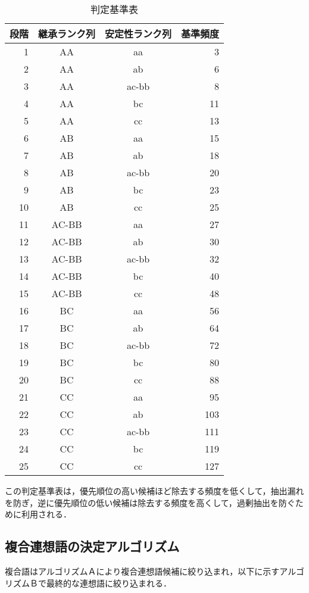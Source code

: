 \begin{table}[t]
 \caption{判定基準表}
 \begin{center}
  \begin{tabular}{rccr}
    \hline\hline
段階 & 継承ランク列 & 安定性ランク列 & 基準頻度 \\
    \hline
1 & AA & aa & 3 \\
2 & AA & ab & 6 \\
3 & AA & ac-bb & 8 \\
4 & AA & bc & 11 \\
5 & AA & cc & 13 \\
6 & AB & aa & 15 \\
7 & AB & ab & 18 \\
8 & AB & ac-bb & 20 \\
9 & AB & bc & 23 \\
10 & AB & cc & 25 \\
11 & AC-BB & aa & 27 \\
12 & AC-BB & ab & 30 \\
13 & AC-BB & ac-bb & 32 \\
14 & AC-BB & bc & 40 \\
15 & AC-BB & cc & 48 \\
16 & BC & aa & 56 \\
17 & BC & ab & 64 \\
18 & BC & ac-bb & 72 \\
19 & BC & bc & 80 \\
20 & BC & cc & 88 \\
21 & CC & aa & 95 \\
22 & CC & ab & 103 \\
23 & CC & ac-bb & 111 \\
24 & CC & bc & 119 \\
25 & CC & cc & 127 \\
    \hline
  \end{tabular}
 \end{center}
\end{table}

この判定基準表は，優先順位の高い候補ほど除去する頻度を低くして，抽出漏れを防ぎ，逆に優先順位の低い候補は除去する頻度を高くして，過剰抽出を防ぐために利用される．

\subsection{複合連想語の決定アルゴリズム}

複合語はアルゴリズムＡにより複合連想語候補に絞り込まれ，以下に示すアルゴリズムＢで最終的な連想語に絞り込まれる．

